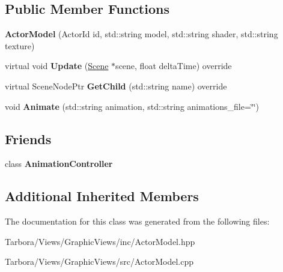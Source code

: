 \subsection*{Public Member Functions}
\begin{DoxyCompactItemize}
\item 
\mbox{\label{classTarbora_1_1ActorModel_a8dd61b7cd4cc494d4d0cdbea246e3b79}} 
{\bfseries Actor\+Model} (Actor\+Id id, std\+::string model, std\+::string shader, std\+::string texture)
\item 
\mbox{\label{classTarbora_1_1ActorModel_a9944324a64a3e7213c1cfbee4947f576}} 
virtual void {\bfseries Update} (\hyperlink{classTarbora_1_1Scene}{Scene} $\ast$scene, float delta\+Time) override
\item 
\mbox{\label{classTarbora_1_1ActorModel_ae162c537a3f3d16c08f2189603de8a32}} 
virtual Scene\+Node\+Ptr {\bfseries Get\+Child} (std\+::string name) override
\item 
\mbox{\label{classTarbora_1_1ActorModel_a1ebd54715b2f4453c6d3dc60e0f1ede9}} 
void {\bfseries Animate} (std\+::string animation, std\+::string animations\+\_\+file=\char`\"{}\char`\"{})
\end{DoxyCompactItemize}
\subsection*{Friends}
\begin{DoxyCompactItemize}
\item 
\mbox{\label{classTarbora_1_1ActorModel_a7899599edce4988a894c8e7431e7bb85}} 
class {\bfseries Animation\+Controller}
\end{DoxyCompactItemize}
\subsection*{Additional Inherited Members}


The documentation for this class was generated from the following files\+:\begin{DoxyCompactItemize}
\item 
Tarbora/\+Views/\+Graphic\+Views/inc/Actor\+Model.\+hpp\item 
Tarbora/\+Views/\+Graphic\+Views/src/Actor\+Model.\+cpp\end{DoxyCompactItemize}
